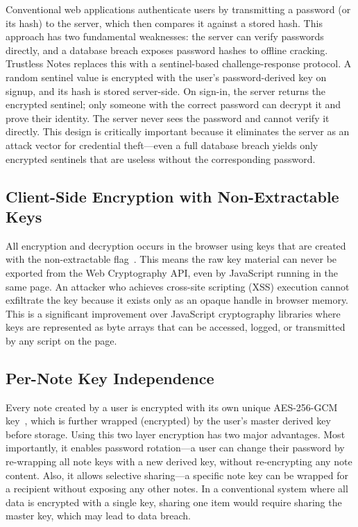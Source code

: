 \documentclass[conference]{IEEEtran}
\begin{document}
Conventional web applications authenticate users by transmitting a password (or its hash) to the server, which then compares it against a stored hash. This approach has two fundamental weaknesses: the server can verify passwords directly, and a database breach exposes password hashes to offline cracking. Trustless Notes replaces this with a sentinel-based challenge-response protocol. A random sentinel value is encrypted with the user's password-derived key on signup, and its hash is stored server-side. On sign-in, the server returns the encrypted sentinel; only someone with the correct password can decrypt it and prove their identity. The server never sees the password and cannot verify it directly. This design is critically important because it eliminates the server as an attack vector for credential theft---even a full database breach yields only encrypted sentinels that are useless without the corresponding password.

\subsection{Client-Side Encryption with Non-Extractable Keys}

All encryption and decryption occurs in the browser using keys that are created with the non-extractable flag~\cite{ref1}. This means the raw key material can never be exported from the Web Cryptography API, even by JavaScript running in the same page. An attacker who achieves cross-site scripting (XSS) execution cannot exfiltrate the key because it exists only as an opaque handle in browser memory. This is a significant improvement over JavaScript cryptography libraries where keys are represented as byte arrays that can be accessed, logged, or transmitted by any script on the page.

\subsection{Per-Note Key Independence}

Every note created by a user is encrypted with its own unique AES-256-GCM key~\cite{ref2,ref16}, which is further wrapped (encrypted) by the user's master derived key before storage. Using this two layer encryption has two major advantages. Most importantly, it enables password rotation---a user can change their password by re-wrapping all note keys with a new derived key, without re-encrypting any note content. Also, it allows selective sharing---a specific note key can be wrapped for a recipient without exposing any other notes. In a conventional system where all data is encrypted with a single key, sharing one item would require sharing the master key, which may lead to data breach.
\end{document}

